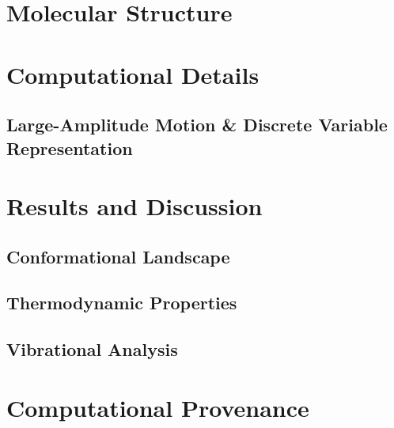 \documentclass[journal=jacsat,manuscript=article]{achemso}
\title{\VAR{title}}
\author{\VAR{authors}}
\affiliation{\VAR{affiliations}}
\begin{document}
\begin{abstract}
\end{abstract}

\section{Molecular Structure}

\section{Computational Details}

\subsection{Large-Amplitude Motion \& Discrete Variable Representation}

\section{Results and Discussion}

\subsection{Conformational Landscape}

\subsection{Thermodynamic Properties}

\subsection{Vibrational Analysis}

\section{Computational Provenance}
\end{document}
